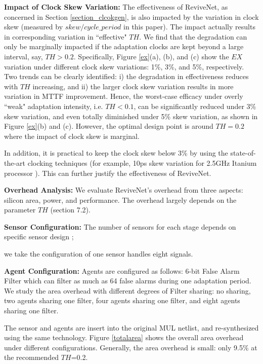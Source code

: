 \textbf{Impact of Clock Skew Variation:} The effectiveness of ReviveNet, as concerned in Section \ref{section_clcokgen}, is also impacted by the variation in clock skew (measured by $skew/cycle\_period$ in this paper). The impact actually results in corresponding variation in ``effective" $TH$. We find that the degradation can only be marginally impacted if the adaptation clocks are kept beyond a large interval, say, $TH>0.2$. Specifically, Figure \ref{ex}(a), (b), and (c) show the $EX$ variation under different clock skew variations: 1\%, 3\%, and 5\%, respectively. Two trends can be clearly identified: i) the degradation in effectiveness  reduces with  $TH$ increasing, and ii) the larger clock skew variation results in more variation in MTTF improvement. Hence, the worst-case efficacy under overly ``weak" adaptation intensity, i.e. $TH<0.1$, can be significantly reduced under 3\% skew variation, and even totally diminished under 5\% skew variation, as shown in Figure \ref{ex}(b) and (c). However, the optimal design point is around $TH=0.2$ where the impact of clock skew is marginal.

In addition, it is practical to keep the clock skew below 3\% by using the state-of-the-art clocking techniques (for example, 10ps skew variation for 2.5GHz Itanium processor \cite{Itanium_clock05}). This can further justify the effectiveness of ReviveNet.



\textbf{Overhead Analysis:} We evaluate ReviveNet's overhead from three aspects: silicon area, power, and performance. The
overhead largely depends on the parameter $TH$ (section 7.2).

\smallskip
{}

{\bf Sensor Configuration:} The number of sensors for each stage depends on specific sensor design
\cite{agarwal2007circuit}\cite{SVFD_09};

we take the configuration of one sensor handles eight signals.



{\bf Agent Configuration:} Agents are configured as follows: 6-bit False Alarm Filter which can
filter as much as 64 false alarms during one adaptation period. We study the area overhead with
different degrees of Filter sharing: no sharing, two agents sharing one filter, four agents sharing
one filter, and eight agents sharing one filter.



The sensor and agents are insert into the original MUL netlist, and re-synthesized using the same
technology. Figure \ref{totalarea} shows the overall area overhead under different configurations. Generally, the area overhead is small: only 9.5\% at the recommended $TH$=0.2.

